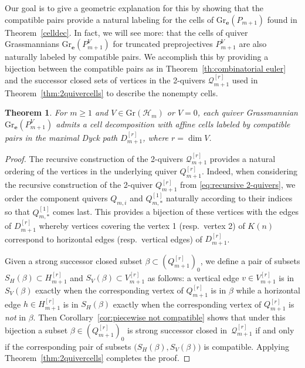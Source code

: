 \documentclass{amsart}
\newtheorem{theorem}{Theorem}[section]
\numberwithin{equation}{section}
\newcommand{\bfe}{\mathbf{e}}
\newcommand{\cH}{\mathcal{H}}
\newcommand{\cQ}{\mathcal{Q}}
\newcommand{\Gr}{\mathrm{Gr}}
\begin{document}
Our goal is to give a geometric explanation for this by showing that the compatible pairs provide a natural labeling for the cells of $\Gr_\bfe(P_{m+1})$ found in Theorem~\ref{celldec}.
In fact, we will see more: that the cells of quiver Grassmannians $\Gr_\bfe(P_{m+1}^V)$ for truncated preprojectives $P_{m+1}^V$ are also naturally labeled by compatible pairs.
We accomplish this by providing a bijection between the compatible pairs as in Theorem~\ref{th:combinatorial euler} and the successor closed sets of vertices in the 2-quivers $\cQ_{m+1}^{[r]}$ used in Theorem~\ref{thm:2quivercells} to describe the nonempty cells.
\begin{theorem}
  \label{th:compatible cells}
  For $m\ge1$ and $V\in\Gr(\cH_m)$ or $V=0$, each quiver Grassmannian $\Gr_\bfe(P_{m+1}^V)$ admits a cell decomposition with affine cells labeled by compatible pairs in the maximal Dyck path $D_{m+1}^{[r]}$, where $r=\dim V$.
\end{theorem}
\begin{proof}
  The recursive construction of the 2-quivers $\cQ_{m+1}^{[r]}$ provides a natural ordering of the vertices in the underlying quiver $Q_{m+1}^{[r]}$.
  Indeed, when considering the recursive construction of the 2-quiver $Q_{m+1}^{[r]}$ from \eqref{eq:recursive 2-quivers}, we order the component quivers $Q_{m,i}$ and $Q_{m,*}^{[1]}$ naturally according to their indices so that $Q_{m,*}^{[1]}$ comes last.
  This provides a bijection of these vertices with the edges of $D_{m+1}^{[r]}$ whereby vertices covering the vertex 1 (resp.\ vertex 2) of $K(n)$ correspond to horizontal edges (resp.\ vertical edges) of $D_{m+1}^{[r]}$.

  Given a strong successor closed subset $\beta\subset(Q_{m+1}^{[r]})_0$, we define a pair of subsets $S_H(\beta)\subset H_{m+1}^{[r]}$ and $S_V(\beta)\subset V_{m+1}^{[r]}$ as follows: a vertical edge $v\in V_{m+1}^{[r]}$ is in $S_V(\beta)$ exactly when the corresponding vertex of $Q_{m+1}^{[r]}$ is in $\beta$ while a horizontal edge $h\in H_{m+1}^{[r]}$ is in $S_H(\beta)$ exactly when the corresponding vertex of $Q_{m+1}^{[r]}$ is \emph{not} in $\beta$.
  Then Corollary~\ref{cor:piecewise not compatible} shows that under this bijection a subset $\beta\in(Q_{m+1}^{[r]})_0$ is strong successor closed in~$\cQ_{m+1}^{[r]}$ if and only if the corresponding pair of subsets $\big(S_H(\beta),S_V(\beta)\big)$ is compatible.
  Applying Theorem~\ref{thm:2quivercells} completes the proof.
\end{proof}
\end{document}
